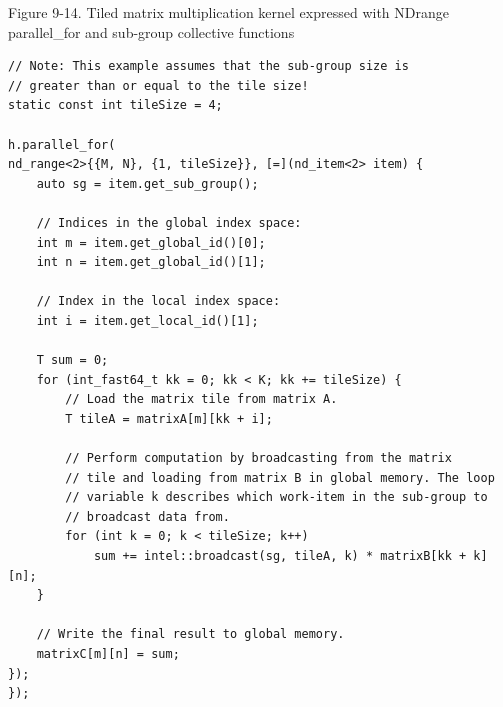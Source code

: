 \hspace*{\fill} \par %
Figure 9-14. Tiled matrix multiplication kernel expressed with NDrange parallel\_for and sub-group collective functions
\begin{lstlisting}[caption={}]
// Note: This example assumes that the sub-group size is 
// greater than or equal to the tile size!
static const int tileSize = 4;

h.parallel_for(
nd_range<2>{{M, N}, {1, tileSize}}, [=](nd_item<2> item) {
	auto sg = item.get_sub_group();
	
	// Indices in the global index space:
	int m = item.get_global_id()[0];
	int n = item.get_global_id()[1];
	
	// Index in the local index space:
	int i = item.get_local_id()[1];
	
	T sum = 0;
	for (int_fast64_t kk = 0; kk < K; kk += tileSize) {
		// Load the matrix tile from matrix A.
		T tileA = matrixA[m][kk + i];
		
		// Perform computation by broadcasting from the matrix
		// tile and loading from matrix B in global memory. The loop
		// variable k describes which work-item in the sub-group to
		// broadcast data from.
		for (int k = 0; k < tileSize; k++)
			sum += intel::broadcast(sg, tileA, k) * matrixB[kk + k][n];
	}

	// Write the final result to global memory.
	matrixC[m][n] = sum;
});
});
\end{lstlisting}



































